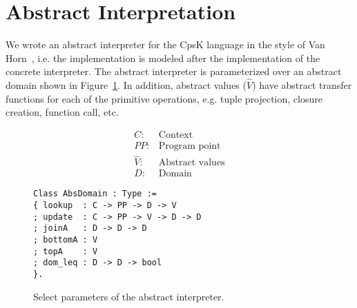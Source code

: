 \documentclass{article}
\begin{document}
\section{Abstract Interpretation}
\label{sec:abstract-interp}

We wrote an abstract interpreter for the CpsK language in the style of Van Horn~\cite{van2010abstracting}, i.e. the implementation is modeled after the implementation of the concrete interpreter. The abstract interpreter is parameterized over an abstract domain shown in Figure~\ref{fig:absinterp}. In addition, abstract values ($\hat{V}$) have abstract transfer functions for each of the primitive operations, e.g. tuple projection, closure creation, function call, etc.

\begin{figure}
\centering
\begin{minipage}[t]{.2\textwidth}
\begin{align*}
C: & \text{Context} \\
PP: & \text{Program point} \\
\hat{V}: & \text{Abstract values} \\
D: & \text{Domain}
\end{align*}
\end{minipage}
\hspace{20pt}
\begin{minipage}[t]{.43\textwidth}
\begin{lstlisting}
Class AbsDomain : Type :=
{ lookup  : C -> PP -> D -> V
; update  : C -> PP -> V -> D -> D
; joinA   : D -> D -> D
; bottomA : V 
; topA    : V 
; dom_leq : D -> D -> bool
}.
\end{lstlisting}
\end{minipage}
\caption{Select parameters of the abstract interpreter.}
\label{fig:absinterp}
\end{figure}
\end{document}
